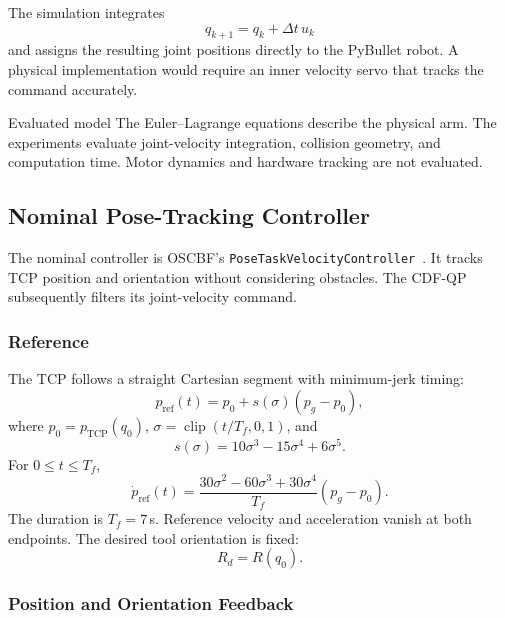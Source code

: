 \documentclass[conference]{IEEEtran}
\DeclareMathOperator{\clip}{clip}
\begin{document}
The simulation integrates
\begin{equation}
    q_{k+1}=q_k+\Delta t\,u_k
    \label{eq:integration}
\end{equation}
and assigns the resulting joint positions directly
to the PyBullet robot. A physical implementation
would require an inner velocity servo that tracks
the command accurately.

\begin{scopebox}{Evaluated model}
The Euler--Lagrange equations describe the physical
arm. The experiments evaluate joint-velocity
integration, collision geometry, and computation
time. Motor dynamics and hardware tracking are
not evaluated.
\end{scopebox}

\subsection{Nominal Pose-Tracking Controller}
\label{sec:nominal}

The nominal controller is OSCBF's
\texttt{PoseTask}\allowbreak\texttt{Velocity}\allowbreak\texttt{Controller}~\cite{morton2025oscbf}.
It tracks TCP position and orientation without
considering obstacles. The CDF-QP subsequently
filters its joint-velocity command.

\subsubsection{Reference}

The TCP follows a straight Cartesian segment
with minimum-jerk timing:
\begin{equation}
    p_{\mathrm{ref}}(t)
    =p_0+s(\sigma)(p_g-p_0),
\end{equation}
where $p_0=p_{\mathrm{TCP}}(q_0)$,
$\sigma=\clip(t/T_f,0,1)$, and
\begin{equation}
    s(\sigma)=10\sigma^3-15\sigma^4+6\sigma^5.
\end{equation}
For $0\leq t\leq T_f$,
\begin{equation}
    \dot p_{\mathrm{ref}}(t)=
    \frac{30\sigma^2-60\sigma^3+30\sigma^4}{T_f}
    (p_g-p_0).
\end{equation}
The duration is $T_f=7$\,s. Reference velocity
and acceleration vanish at both endpoints.
The desired tool orientation is fixed:
\begin{equation}
    R_d=R(q_0).
\end{equation}

\subsubsection{Position and Orientation Feedback}
\end{document}
